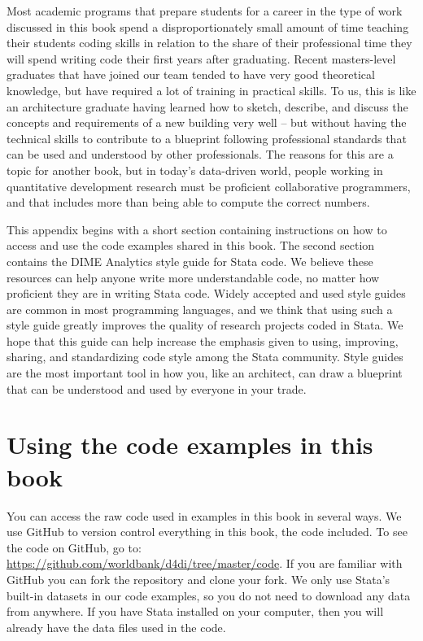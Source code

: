 
\begin{fullwidth}

Most academic programs that prepare students for a career
in the type of work discussed in this book
spend a disproportionately small amount of time teaching their students coding skills
in relation to the share of their professional time they will spend writing code
their first years after graduating.
Recent masters-level graduates that have joined our team
tended to have very good theoretical knowledge,
but have required a lot of training in practical skills.
To us, this is like an architecture graduate having learned
how to sketch, describe, and discuss
the concepts and requirements of a new building very well --
but without having the technical skills
to contribute to a blueprint following professional standards
that can be used and understood by other professionals.
The reasons for this are a topic for another book,
but in today's data-driven world,
people working in quantitative development research must be proficient collaborative programmers,
and that includes more than being able to compute the correct numbers.

This appendix begins with a short section containing instructions
on how to access and use the code examples shared in this book.
The second section contains the DIME Analytics style guide for Stata code.
We believe these resources can help anyone write more understandable code,
no matter how proficient they are in writing Stata code.
Widely accepted and used style guides are common in most programming languages,
and we think that using such a style guide greatly improves the quality
of research projects coded in Stata.
We hope that this guide can help increase the emphasis
given to using, improving, sharing, and standardizing code style among the Stata community.
Style guides are the most important tool in how you, like an architect,
can draw a blueprint that can be understood and used by everyone in your trade.

\end{fullwidth}


\section{Using the code examples in this book}

You can access the raw code used in examples in this book in several ways.
We use GitHub to version control everything in this book, the code included.
To see the code on GitHub, go to: \url{https://github.com/worldbank/d4di/tree/master/code}.
If you are familiar with GitHub you can fork the repository and clone your fork.
We only use Stata's built-in datasets in our code examples,
so you do not need to download any data from anywhere.
If you have Stata installed on your computer, then you will already have the data files used in the code.

